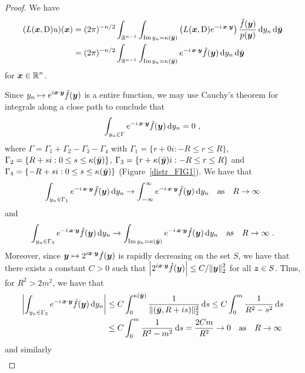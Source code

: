\begin{proof}
We have
\begin{align}
(L({\bm{x}},\operatorname{D})u)({\bm{x}}) &= 
(2\pi)^{-n/2} \int_{\mathbb{R}^{n-1}} \int_{\operatorname{Im} y_n = \kappa(\breve{{\bm{y}}})}
\left( L({\bm{x}},\operatorname{D}) e^{-i\, {\bm{x}}\cdot{\bm{y}}} \right)
\frac{\hat{f}({\bm{y}})}{p({\bm{y}})} \,\mathrm{d}{y_n}\,\mathrm{d}{\breve{{\bm{y}}}}
\nonumber \\
&= (2\pi)^{-n/2} \int_{\mathbb{R}^{n-1}} \int_{\operatorname{Im} y_n = \kappa(\breve{{\bm{y}}})}
e^{-i\, {\bm{x}}\cdot{\bm{y}}} \hat{f}({\bm{y}}) \,\mathrm{d}{y_n}\,\mathrm{d}{\breve{{\bm{y}}}}
\label{distrlPDE3eq1}
\end{align}
for $\displaystyle {\bm{x}} \in \mathbb{R}^n$.

Since $\displaystyle y_n \mapsto e^{i{\bm{x}}\cdot{\bm{y}}} \hat{f}({\bm{y}})$ is a
entire function, we may use Cauchy's theorem for
integrals along a close path to conclude that
\[
\int_{y_n \in \Gamma}
e^{-i\, {\bm{x}}\cdot{\bm{y}}} \hat{f}({\bm{y}}) \,\mathrm{d}{y_n} = 0 \ ,
\]
where $\Gamma = \Gamma_1 + \Gamma_2 - \Gamma_3 - \Gamma_4$ with
$\Gamma_1 = \{ r+ 0 i : -R \leq r \leq R \}$,
$\Gamma_2 = \{ R+ s i : 0 \leq s \leq \kappa(\breve{{\bm{y}}}) \}$,
$\Gamma_3 = \{ r+ \kappa(\breve{{\bm{y}}}) i : -R \leq r \leq R \}$
and
$\Gamma_4 = \{ -R+ s i : 0 \leq s \leq \kappa(\breve{{\bm{y}}}) \}$
(Figure~\ref{distr_FIG1}).
We have that
\[
\int_{y_n \in \Gamma_1}
e^{-i\, {\bm{x}}\cdot{\bm{y}}} \hat{f}({\bm{y}}) \,\mathrm{d}{y_n}
\to
\int_{-\infty}^{\infty}
e^{-i\, {\bm{x}}\cdot{\bm{y}}} \hat{f}({\bm{y}}) \,\mathrm{d}{y_n}
\quad \text{as} \quad R \to \infty
\]
and
\[
\int_{y_n \in \Gamma_3}
e^{-i\, {\bm{x}}\cdot{\bm{y}}} \hat{f}({\bm{y}}) \,\mathrm{d}{y_n}
\to 
\int_{\operatorname{Im} y_n = \kappa(\breve{{\bm{y}}})}
e^{-i\, {\bm{x}}\cdot{\bm{y}}} \hat{f}({\bm{y}}) \,\mathrm{d}{y_n}
\quad \text{as} \quad R \to \infty \ .
\]
Moreover, since
$\displaystyle {\bm{y}} \mapsto 2^{i{\bm{x}}\cdot{\bm{y}}} \hat{f}({\bm{y}})$ is
rapidly decreasing on the set $S$, we have that there exists a
constant $C>0$ such that
$\displaystyle \left| 2^{i{\bm{x}}\cdot{\bm{y}}} \hat{f}({\bm{y}}) \right| \leq
C/ \|{\bm{y}}\|_2^2$ for all ${\bm{z}} \in S$.  Thus, for
$\displaystyle R^2>2m^2$, we have that
\begin{align*}
\left| \int_{y_n \in \Gamma_2}
e^{-i\, {\bm{x}}\cdot{\bm{y}}} \hat{f}({\bm{y}}) \,\mathrm{d}{y_n} \right|
& \leq C \int_0^{\kappa(\breve{{\bm{y}}})}
\frac{1}{\|(\breve{{\bm{y}}},R+is)\|_2^2} \,\mathrm{d}{s}
\leq C \int_0^m \frac{1}{ R^2 - s^2} \,\mathrm{d}{s} \\
& \leq C \int_0^m \frac{1}{ R^2 - m^2} \,\mathrm{d}{s}
= \frac{2Cm}{R^2} \to 0
\quad \text{as} \quad R \to \infty
\end{align*}
and similarly
\begin{align*}

\end{align*}
\end{proof}
